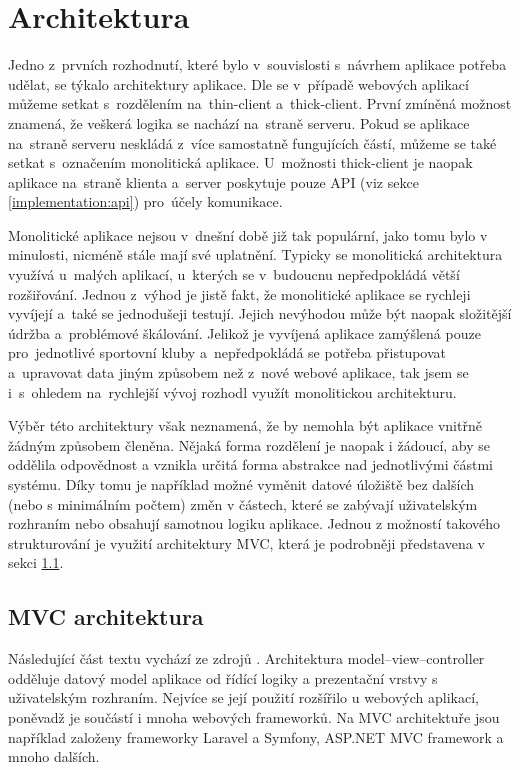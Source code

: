 \section{Architektura}
Jedno z~prvních rozhodnutí, které bylo v~souvislosti s~návrhem aplikace potřeba udělat, se týkalo architektury aplikace. Dle \cite{twa_architecture} se v~případě webových aplikací můžeme setkat s~rozdělením na~thin-client a~thick-client. První zmíněná možnost znamená, že veškerá logika se nachází na~straně serveru. Pokud se aplikace na~straně serveru neskládá z~více samostatně fungujících částí, můžeme se také setkat s~označením monolitická aplikace. U~možnosti thick-client je naopak aplikace na~straně klienta a~server poskytuje pouze API (viz sekce \ref{implementation:api}) pro~účely komunikace.

Monolitické aplikace nejsou v~dnešní době již tak populární, jako tomu bylo v minulosti, nicméně stále mají své uplatnění. Typicky se monolitická architektura využívá u~malých aplikací, u~kterých se v~budoucnu nepředpokládá větší rozšiřování. Jednou z~výhod je jistě fakt, že monolitické aplikace se rychleji vyvíjejí a~také se jednodušeji testují. Jejich nevýhodou může být naopak složitější údržba a~problémové škálování. \cite{twa_architecture, monolithic_architecture} Jelikož je vyvíjená aplikace zamýšlená pouze pro~jednotlivé sportovní kluby a~nepředpokládá se potřeba přistupovat a~upravovat data jiným způsobem než z~nové webové aplikace, tak jsem se i~s~ohledem na~rychlejší vývoj rozhodl využít monolitickou architekturu.

Výběr této architektury však neznamená, že by nemohla být aplikace vnitřně žádným způsobem členěna. Nějaká forma rozdělení je naopak i žádoucí, aby se oddělila odpovědnost a vznikla určitá forma abstrakce nad jednotlivými částmi systému. Díky tomu je například možné vyměnit datové úložiště bez dalších (nebo s minimálním počtem) změn v částech, které se zabývají uživatelským rozhraním nebo obsahují samotnou logiku aplikace. Jednou z možností takového strukturování je využití architektury MVC, která je podrobněji představena v sekci \ref{section:mvc}.

\subsection{MVC architektura}\label{section:mvc}
Následující část textu vychází ze zdrojů \cite{it_network_mvc, mdn_mvc}. Architektura model–view–controller odděluje datový model aplikace od řídící logiky a prezentační vrstvy s uživatelským rozhraním. Nejvíce se její použití rozšířilo u webových aplikací, poněvadž je součástí i mnoha webových frameworků. Na MVC architektuře jsou například založeny frameworky Laravel a Symfony, ASP.NET MVC framework a mnoho dalších.

